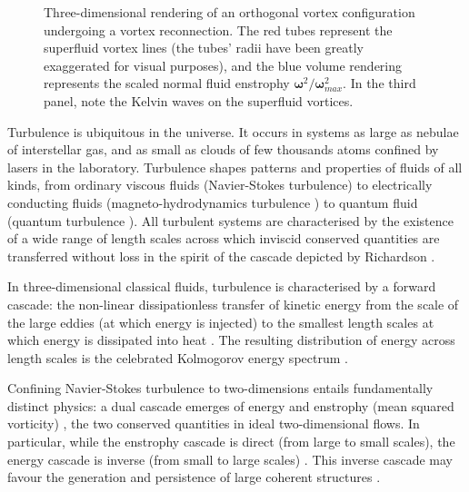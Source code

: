 \documentclass[%
 reprint,
 amsmath,amssymb,
 aps,
 prl,
]{revtex4-2}
\newcommand{\bom}{\boldsymbol{\omega}}
\def\red#1{\textcolor{red}{#1}}
\begin{document}
\begin{figure}
\begin{subfigure}[b]{0.24\textwidth}
	\end{subfigure} \hfill
	\caption{Three-dimensional rendering of an orthogonal vortex configuration 
undergoing a vortex reconnection. The red tubes represent
the superfluid vortex
lines (the tubes' radii have been greatly exaggerated for visual purposes), 
and the blue volume rendering represents the scaled normal fluid enstrophy 
$\bom^2/\bom^2_{max}$. In the third panel, note the Kelvin waves on the superfluid vortices.}
    \label{fig:visualisation}
\end{figure}

Turbulence is ubiquitous in the universe.  It occurs in systems
as large as nebulae of interstellar gas, and as small as clouds of
few thousands atoms confined by lasers in the laboratory.
Turbulence shapes patterns and properties of fluids of all
kinds, from ordinary
 viscous fluids (Navier-Stokes turbulence\cite{frisch1995}) 
to electrically conducting fluids (magneto-hydrodynamics turbulence
\cite{canuto-dalsgaard-1998}) to quantum fluid
(quantum turbulence \cite{barenghi-etal-2023,
Barenghi_Skrbek_Sreenivasan_2023}).
All turbulent systems are characterised by 
the existence of a wide range 
of length scales across which inviscid conserved quantities 
are transferred without loss in the spirit of the cascade 
depicted by Richardson \cite{richardson1922weather}. 

In three-dimensional classical fluids, turbulence 
is characterised by a forward cascade: the
non-linear dissipationless transfer of kinetic energy from the scale of
the large eddies (at which energy is injected) to the smallest length scales
at which energy is dissipated into heat
\cite{richardson1922weather,kolmogorov-1941}. 
The resulting distribution of energy across length scales is
the celebrated Kolmogorov energy spectrum 
\cite{kolmogorov-1941,frisch1995}. 

Confining Navier-Stokes turbulence to two-dimensions entails 
fundamentally distinct physics: a dual cascade emerges of energy and enstrophy 
(mean squared vorticity) \cite{kraichnan-1967,boffetta-ecke-2012}, 
the two conserved quantities in ideal two-dimensional flows.
In particular, while the enstrophy cascade is direct (from large to small
scales), the energy cascade is inverse (from small to large scales)
\cite{boffetta-musacchio-2010}. This inverse cascade 
may favour the generation and persistence of large coherent 
structures \cite{laurie-etal-2014}. 
\end{document}

